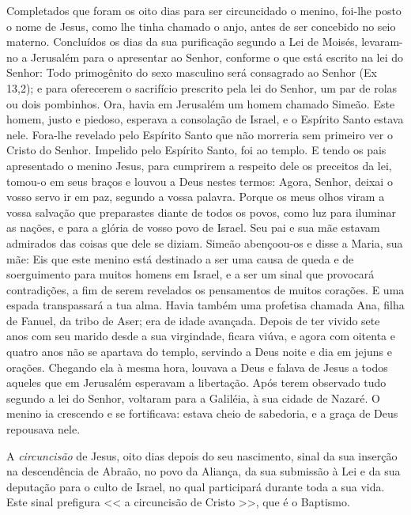 \documentclass{rosario}
\begin{document}
Completados que foram os oito dias para ser circuncidado o menino, foi-lhe posto o nome de Jesus, como lhe tinha chamado o anjo, antes de ser concebido no seio materno.
Concluídos os dias da sua purificação segundo a Lei de Moisés, levaram-no a Jerusalém para o apresentar ao Senhor,
conforme o que está escrito na lei do Senhor:
Todo primogênito do sexo masculino será consagrado ao Senhor (Ex 13,2);
e para oferecerem o sacrifício prescrito pela lei do Senhor, um par de rolas ou dois pombinhos.
Ora, havia em Jerusalém um homem chamado Simeão.
Este homem, justo e piedoso, esperava a consolação de Israel, e o Espírito Santo estava nele.
Fora-lhe revelado pelo Espírito Santo que não morreria sem primeiro ver o Cristo do Senhor.
Impelido pelo Espírito Santo, foi ao templo.
E tendo os pais apresentado o menino Jesus, para cumprirem a respeito dele os preceitos da lei,
tomou-o em seus braços e louvou a Deus nestes termos:
Agora, Senhor, deixai o vosso servo ir em paz, segundo a vossa palavra.
Porque os meus olhos viram a vossa salvação
que preparastes diante de todos os povos,
como luz para iluminar as nações, e para a glória de vosso povo de Israel.
Seu pai e sua mãe estavam admirados das coisas que dele se diziam.
Simeão abençoou-os e disse a Maria, sua mãe:
Eis que este menino está destinado a ser uma causa de queda e de soerguimento para muitos homens em Israel, e a ser um sinal que provocará contradições,
a fim de serem revelados os pensamentos de muitos corações.
E uma espada transpassará a tua alma.
Havia também uma profetisa chamada Ana, filha de Fanuel, da tribo de Aser;
era de idade avançada.
Depois de ter vivido sete anos com seu marido desde a sua virgindade, ficara viúva, e agora com oitenta e quatro anos não se apartava do templo, servindo a Deus noite e dia em jejuns e orações.
Chegando ela à mesma hora, louvava a Deus e falava de Jesus a todos aqueles que em Jerusalém esperavam a libertação.
Após terem observado tudo segundo a lei do Senhor, voltaram para a Galiléia, à sua cidade de Nazaré.
O menino ia crescendo e se fortificava:
estava cheio de sabedoria, e a graça de Deus repousava nele.



A \emph{circuncisão} de Jesus, oito dias depois do seu nascimento, sinal da sua inserção na descendência de Abraão, no povo da Aliança, da sua submissão à Lei e da sua deputação para o culto de Israel, no qual participará durante toda a sua vida.
Este sinal prefigura << a circuncisão de Cristo >>, que é o Baptismo.
\end{document}
